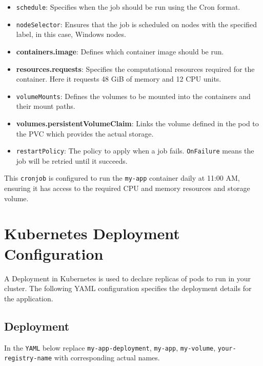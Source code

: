 \documentclass{article}
\begin{document}
\begin{itemize}
    \item \texttt{schedule}: Specifies when the job should be run using the Cron format.
    \item \texttt{nodeSelector}: Ensures that the job is scheduled on nodes with the specified label, in this case, Windows nodes.
    \item \textbf{containers.image}: Defines which container image should be run.
    \item \textbf{resources.requests}: Specifies the computational resources required for the container. Here it requests 48 GiB of memory and 12 CPU units.
    \item \texttt{volumeMounts}: Defines the volumes to be mounted into the containers and their mount paths.
    \item \textbf{volumes.persistentVolumeClaim}: Links the volume defined in the pod to the PVC which provides the actual storage.
    \item \texttt{restartPolicy}: The policy to apply when a job fails. \texttt{OnFailure} means the job will be retried until it succeeds.
\end{itemize}

This \texttt{cronjob} is configured to run the \texttt{my-app} container daily at 11:00 AM, ensuring it has access to the required CPU and memory resources and storage volume.

\section{Kubernetes Deployment Configuration}  

A Deployment in Kubernetes \cite{aksdeploy} is used to declare replicas of pods to run in your cluster. The following YAML configuration specifies the deployment details for the application.

\subsection{Deployment} \label{deploy}

In the \texttt{YAML} below replace \texttt{my-app-deployment}, \texttt{my-app}, \texttt{my-volume}, \texttt{your-registry-name} with corresponding actual names. 
 
\end{document}
